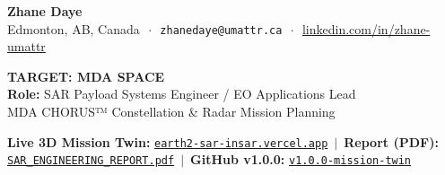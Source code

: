 \documentclass[10pt,letterpaper]{article}
\begin{document}
\begin{tcolorbox}[colframe=mdanavy,colback=mdanavy,coltext=white,boxrule=0pt,top=6pt,bottom=6pt]
\begin{minipage}[c]{0.58\textwidth}
    {\Large\textbf{Zhane Daye}} \\[2pt]
    {\footnotesize Edmonton, AB, Canada $\,\cdot\,$ \texttt{zhanedaye@umattr.ca} $\,\cdot\,$ \href{https://www.linkedin.com/in/zhane-umattr}{linkedin.com/in/zhane-umattr}}
\end{minipage}
\hfill
\begin{minipage}[c]{0.40\textwidth}
    \raggedleft
    {\large\textbf{TARGET: MDA SPACE}}\\[1pt]
    {\footnotesize\textbf{Role:} SAR Payload Systems Engineer / EO Applications Lead}\\[1pt]
    {\scriptsize MDA CHORUS™ Constellation \& Radar Mission Planning}
\end{minipage}
\end{tcolorbox}

\vspace{-4pt}

\begin{tcolorbox}[colframe=bordergray,colback=lightbg,top=3pt,bottom=3pt]
\footnotesize
\textbf{Live 3D Mission Twin:} \href{https://earth2-sar-insar.vercel.app}{\texttt{earth2-sar-insar.vercel.app}} $\,\vert\,$ 
\textbf{Report (PDF):} \href{https://earth2-sar-insar.vercel.app/reports/EARTH2_X_BAND_SAR_INSAR_ENGINEERING_REPORT.pdf}{\texttt{SAR\_ENGINEERING\_REPORT.pdf}} $\,\vert\,$ 
\textbf{GitHub v1.0.0:} \href{https://github.com/zrt219/earth2studio/releases/tag/v1.0.0-mission-twin}{\texttt{v1.0.0-mission-twin}}
\end{tcolorbox}

\vspace{-4pt}
\end{document}
